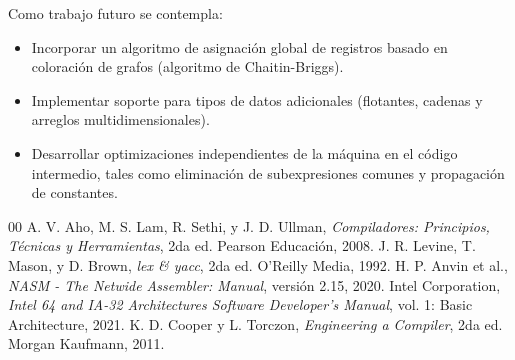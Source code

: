 \documentclass[conference]{IEEEtran}
\begin{document}
Como trabajo futuro se contempla:
\begin{itemize}
    \item Incorporar un algoritmo de asignación global de registros basado en coloración de grafos (algoritmo de Chaitin-Briggs).
    \item Implementar soporte para tipos de datos adicionales (flotantes, cadenas y arreglos multidimensionales).
    \item Desarrollar optimizaciones independientes de la máquina en el código intermedio, tales como eliminación de subexpresiones comunes y propagación de constantes.
\end{itemize}

\begin{thebibliography}{00}
 A. V. Aho, M. S. Lam, R. Sethi, y J. D. Ullman, \textit{Compiladores: Principios, Técnicas y Herramientas}, 2da ed. Pearson Educación, 2008.
 J. R. Levine, T. Mason, y D. Brown, \textit{lex \& yacc}, 2da ed. O'Reilly Media, 1992.
 H. P. Anvin et al., \textit{NASM - The Netwide Assembler: Manual}, versión 2.15, 2020.
 Intel Corporation, \textit{Intel 64 and IA-32 Architectures Software Developer's Manual}, vol. 1: Basic Architecture, 2021.
 K. D. Cooper y L. Torczon, \textit{Engineering a Compiler}, 2da ed. Morgan Kaufmann, 2011.
\end{thebibliography}
\end{document}
